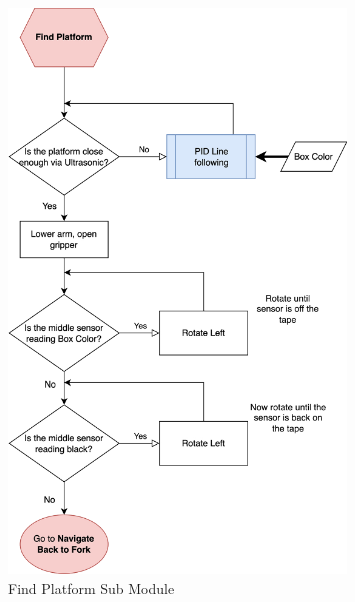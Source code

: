 \documentclass[12pt]{report}
\begin{document}
\begin{figure}[H]
    \centering
    \includegraphics[width=0.8\textwidth]{Images/flowchart/find_platform.pdf}
    \caption{Find Platform Sub Module}
    \label{fig:fc:find-platform}
\end{figure}
\end{document}
